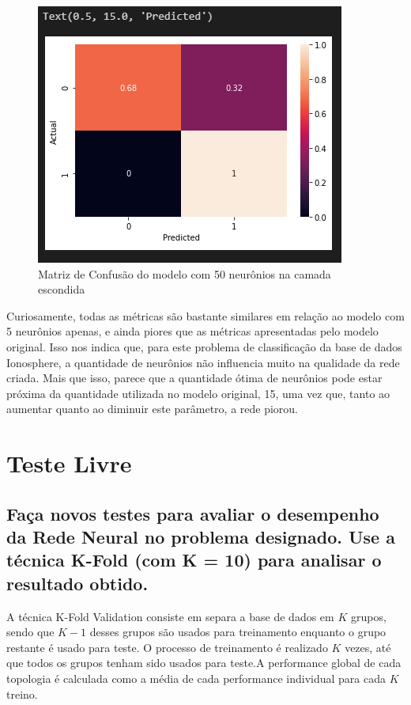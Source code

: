\documentclass[12pt]{article}
\begin{document}
\begin{figure}[H]
	\centering
	\includegraphics[width=0.7\linewidth]{Imagens/50neuronios/confusao50neuronios}
	\caption{Matriz de Confusão do modelo com 50 neurônios na camada escondida}
	\label{fig:confusao50neuronios}
\end{figure}

Curiosamente, todas as métricas são bastante similares em relação ao modelo com 5 neurônios apenas, e ainda piores que as métricas apresentadas pelo modelo original. Isso nos indica que, para este problema de classificação da base de dados Ionosphere, a quantidade de neurônios não influencia muito na qualidade da rede criada. Mais que isso, parece que a quantidade ótima de neurônios pode estar próxima da quantidade utilizada no modelo original, 15, uma vez que, tanto ao aumentar quanto ao diminuir este parâmetro, a rede piorou. 
\section{Teste Livre}\label{sec:testelivre}

\subsection{Faça novos testes para avaliar o desempenho da Rede Neural no	problema designado. Use a técnica K-Fold (com K = 10) para analisar o	resultado obtido.}

A técnica K-Fold Validation consiste em separa a base de dados em $K$ grupos, sendo que $K-1$ desses grupos são usados para treinamento enquanto o grupo restante é usado para teste. O processo de treinamento é realizado $K$ vezes, até que todos os grupos tenham sido usados para teste.A performance global de cada topologia é calculada como a média de cada performance individual para cada $K$ treino. \cite{Livro} 
\end{document}
